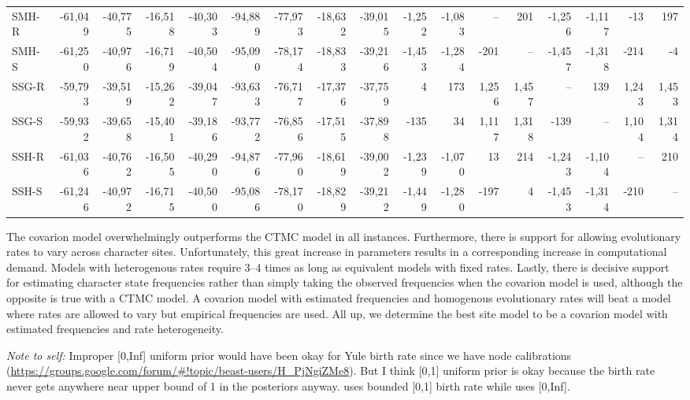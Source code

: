 \documentclass[]{article}
\begin{document}
\begin{landscape}
\begin{table}
\begin{tabular}[t]{lrrrrrrrrrrrrrrrr}
SMH-R & -61,049 & -40,775 & -16,518 & -40,303 & -94,889 & -77,973 & -18,632 & -39,015 & -1,252 & -1,083 & -- & 201 & -1,256 & -1,117 & -13 & 197\\
SMH-S & -61,250 & -40,976 & -16,719 & -40,504 & -95,090 & -78,174 & -18,833 & -39,216 & -1,453 & -1,284 & -201 & -- & -1,457 & -1,318 & -214 & -4\\
\addlinespace
SSG-R & -59,793 & -39,519 & -15,262 & -39,047 & -93,633 & -76,717 & -17,376 & -37,759 & 4 & 173 & 1,256 & 1,457 & -- & 139 & 1,243 & 1,453\\
SSG-S & -59,932 & -39,658 & -15,401 & -39,186 & -93,772 & -76,856 & -17,515 & -37,898 & -135 & 34 & 1,117 & 1,318 & -139 & -- & 1,104 & 1,314\\
SSH-R & -61,036 & -40,762 & -16,505 & -40,290 & -94,876 & -77,960 & -18,619 & -39,002 & -1,239 & -1,070 & 13 & 214 & -1,243 & -1,104 & -- & 210\\
SSH-S & -61,246 & -40,972 & -16,715 & -40,500 & -95,086 & -78,170 & -18,829 & -39,212 & -1,449 & -1,280 & -197 & 4 & -1,453 & -1,314 & -210 & --\\
\bottomrule
\end{tabular}
\end{table}
\end{landscape}

The covarion model overwhelmingly outperforms the CTMC model in all instances. Furthermore, there is support for allowing evolutionary rates to vary across character sites. Unfortunately, this great increase in parameters results in a corresponding increase in computational demand. Models with heterogenous rates require 3--4 times as long as equivalent models with fixed rates. Lastly, there is decisive support for estimating character state frequencies rather than simply taking the observed frequencies when the covarion model is used, although the opposite is true with a CTMC model. A covarion model with estimated frequencies and homogenous evolutionary rates will beat a model where rates are allowed to vary but empirical frequencies are used. All up, we determine the best site model to be a covarion model with estimated frequencies and rate heterogeneity.

\emph{Note to self:} Improper {[}0,Inf{]} uniform prior would have been okay for Yule birth rate since we have node calibrations (\url{https://groups.google.com/forum/\#!topic/beast-users/H_PjNgiZMe8}). But I think {[}0,1{]} uniform prior is okay because the birth rate never gets anywhere near upper bound of 1 in the posteriors anyway. \textcite{kolipakam_bayesian_2018} uses bounded {[}0,1{]} birth rate while \textcite{bouckaert_origin_2018} uses {[}0,Inf{]}.
\end{document}
